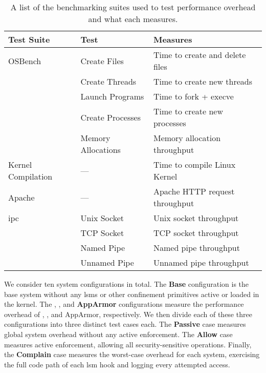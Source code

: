 \begin{table}[htpb]
  \centering
  \caption[List of benchmarking suites and what they measure]{
    A list of the benchmarking suites used to test performance overhead and what each
    measures.
  }%
  \label{tab:suites}
  \begin{tabular}{llp{3in}}
  \toprule
  Test Suite & Test & Measures \\
  \midrule
  OSBench                    & Create Files       & Time to create and delete files \\
                             & Create Threads     & Time to create new threads \\
                             & Launch Programs    & Time to fork + execve \\
                             & Create Processes   & Time to create new processes \\
                             & Memory Allocations & Memory allocation throughput \\
  Kernel Compilation         & ---                & Time to compile Linux Kernel \\
  Apache                     & ---                & Apache HTTP request throughput \\
  \gls{ipc}                  & Unix Socket        & Unix socket throughput \\
                             & TCP Socket         & TCP socket throughput  \\
                             & Named Pipe         & Named pipe throughput  \\
                             & Unnamed Pipe       & Unnamed pipe throughput \\
  \bottomrule
  \end{tabular}
\end{table}

We consider ten system configurations in total. The \textbf{Base} configuration is the
base system without any \glspl{lsm} or other confinement primitives active or loaded in
the kernel. The \textbf{\bpfbox}, \textbf{\bpfcontain}, and \textbf{AppArmor}
configurations measure the performance overhead of \bpfbox{}, \bpfcontain{}, and AppArmor,
respectively. We then divide each of these three configurations into three distinct
test cases each. The \textbf{Passive} case measures global system overhead
without any active enforcement. The \textbf{Allow} case measures active
enforcement, allowing all security-sensitive operations. Finally, the \textbf{Complain}
case measures the worst-case overhead for each system, exercising the full code
path of each \gls{lsm} hook and logging every attempted access.

